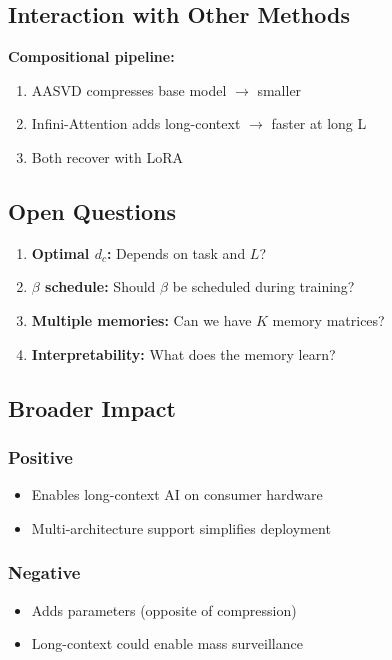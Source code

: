 \subsection{Interaction with Other Methods}

\textbf{Compositional pipeline:}

\begin{enumerate}
\item AASVD compresses base model $\to$ smaller
\item Infini-Attention adds long-context $\to$ faster at long L
\item Both recover with LoRA

\end{enumerate}
\subsection{Open Questions}

\begin{enumerate}
\item \textbf{Optimal $d_c$:} Depends on task and $L$?
\item \textbf{$\beta$ schedule:} Should $\beta$ be scheduled during training?
\item \textbf{Multiple memories:} Can we have $K$ memory matrices?
\item \textbf{Interpretability:} What does the memory learn?

\end{enumerate}
\subsection{Broader Impact}

\subsubsection{Positive}
\begin{itemize}
\item Enables long-context AI on consumer hardware
\item Multi-architecture support simplifies deployment

\end{itemize}
\subsubsection{Negative}
\begin{itemize}
\item Adds parameters (opposite of compression)
\item Long-context could enable mass surveillance

\end{itemize}
